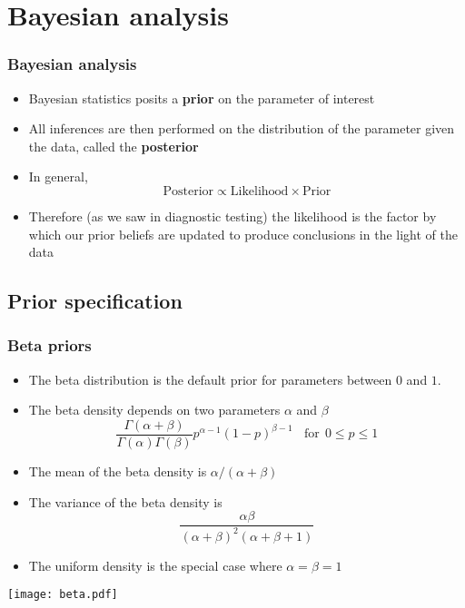 \documentclass[aspectratio=169]{beamer}
\begin{document}
\section{Bayesian analysis}
\begin{frame}\frametitle{Bayesian analysis}
\begin{itemize}
\item Bayesian statistics posits a {\bf prior} on the parameter
  of interest
\item All inferences are then performed on the distribution of 
  the parameter given the data, called the {\bf posterior}
\item In general,
  $$
  \mbox{Posterior} \propto \mbox{Likelihood} \times \mbox{Prior}
  $$
\item Therefore (as we saw in diagnostic testing) the likelihood is
  the factor by which our prior beliefs are updated to produce
  conclusions in the light of the data
\end{itemize}
\end{frame}

\subsection{Prior specification}
\begin{frame}\frametitle{Beta priors}
\begin{itemize}
\item The beta distribution is the default prior
  for parameters between $0$ and $1$.
\item The beta density depends on two parameters $\alpha$ and $\beta$
$$
\frac{\Gamma(\alpha +  \beta)}{\Gamma(\alpha)\Gamma(\beta)}
 p ^ {\alpha - 1} (1 - p) ^ {\beta - 1} ~~~~\mbox{for} ~~ 0 \leq p \leq 1
$$
\item The mean of the beta density is $\alpha / (\alpha + \beta)$
\item The variance of the beta density is \
$$\frac{\alpha \beta}{(\alpha + \beta)^2 (\alpha + \beta + 1)}$$
\item The uniform density is the special case where $\alpha = \beta = 1$
\end{itemize}
\end{frame}

\begin{frame}
\texttt{[image: beta.pdf]}
\end{frame}
\end{document}
